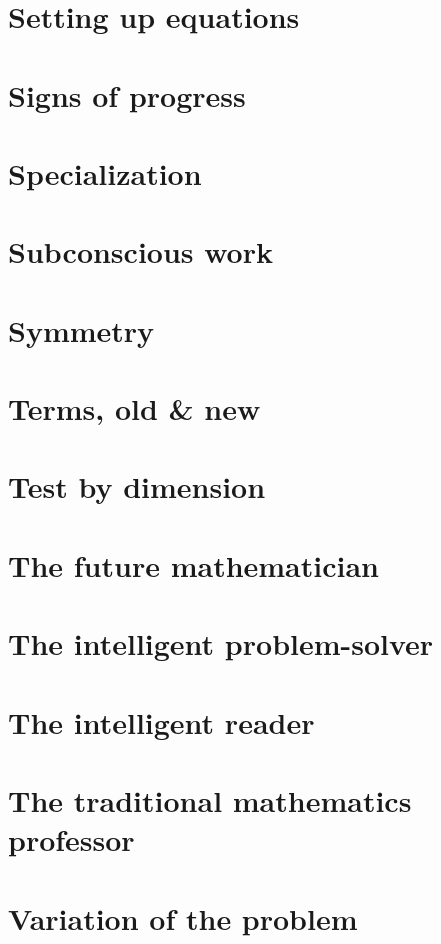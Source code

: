 \documentclass[oneside]{book}
\numberwithin{equation}{section}
\begin{document}
\section{Setting up equations}

\section{Signs of progress}

\section{Specialization}

\section{Subconscious work}

\section{Symmetry}

\section{Terms, old \& new}

\section{Test by dimension}

\section{The future mathematician}

\section{The intelligent problem-solver}

\section{The intelligent reader}

\section{The traditional mathematics professor}

\section{Variation of the problem}
\end{document}
